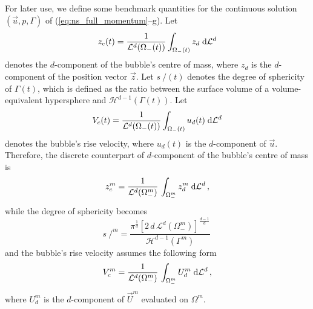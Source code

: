 \documentclass[a4paper,12pt,onecolumn]{article}
\newcommand{\vol}{\mathcal{L}^d}
\newcommand{\surfvol}{\mathcal{H}^{d-1}}
\newcommand{\dL}[1]{\;{\rm d}{\cal L}^{#1}} %
\newcommand{\strikes}{\mbox{$s\!\!\!\!\:/$}}
\begin{document}
For later use, we define some benchmark quantities for the continuous
solution $(\vec u, p, \Gamma)$ of (\ref{eq:ns_full_momentum}--g). Let
\begin{equation}
z_c(t) = \frac{1}{\vol(\Omega_-(t))}\int_{\Omega_-(t)} z_d \dL{d}
\end{equation}
denotes the $d$-component of the bubble's centre of mass, where $z_d$ is the
$d$-component of the position vector $\vec z$. Let $\strikes(t)$ denotes the
degree of sphericity of $\Gamma(t)$, which is defined as the ratio between the
surface volume of a volume-equivalent hypersphere and $\surfvol(\Gamma(t))$. Let
\begin{equation}
V_c(t) = \frac{1}{\vol(\Omega_-(t))}\int_{\Omega_-(t)} u_d(t) \dL{d}
\end{equation}
denotes the bubble's rise velocity, where $u_d(t)$ is the $d$-component of
$\vec u$. Therefore, the discrete counterpart of $d$-component of the bubble's
centre of mass is
\begin{equation}
z_c^m = \frac{1}{\vol(\Omega_-^m)}\,\int_{\Omega_-^m} z_d^{m} \dL{d}\,,
\end{equation}
while the degree of sphericity becomes
\begin{equation}
\strikes^m =\frac{\pi^{\frac{1}{d}}[2\,d\,\vol(\Omega_-^m)]^\frac{d-1}{d}}
{\surfvol(\Gamma^m)}\,
\end{equation}
and the bubble's rise velocity assumes the following form
\begin{equation}
V^m_c = \frac{1}{\vol(\Omega_-^m)}\,\int_{\Omega_-^m}U^m_d\dL{d}\,,
\end{equation}
where $U^m_d$ is the $d$-component of $\vec U^m$ evaluated on $\Omega^m$.
\end{document}
